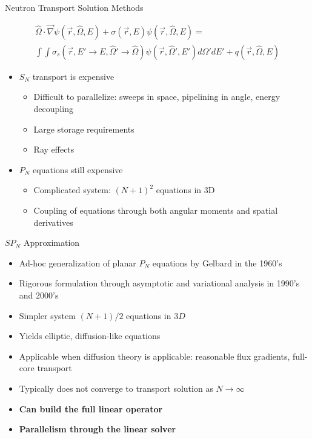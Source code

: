 \documentclass{beamer}
\begin{document}
\begin{frame}{Neutron Transport Solution Methods}

  \begin{multline}
    \hat{\Omega} \cdot \vec{\nabla} \psi(\vec{r},\hat{\Omega},E) +
    \sigma(\vec{r},E) \psi(\vec{r},\hat{\Omega},E) = \\ \int \int
    \sigma_s(\vec{r},E' \rightarrow E,\hat{\Omega}' \rightarrow
    \hat{\Omega}) \psi(\vec{r},\hat{\Omega}',E') d\Omega' dE' +
    q(\vec{r},\hat{\Omega},E)
    \label{eq:general_transport}
  \end{multline}

  \begin{itemize}
  \item $S_N$ transport is expensive
    \begin{itemize}
    \item Difficult to parallelize: sweeps in space, pipelining in
      angle, energy decoupling
    \item Large storage requirements
    \item Ray effects
    \end{itemize}
  \item $P_N$ equations still expensive
    \begin{itemize}
    \item Complicated system: $(N+1)^2$ equations in 3D
    \item Coupling of equations through both angular moments and
      spatial derivatives
    \end{itemize}
  \end{itemize}
\end{frame}

\begin{frame}{$SP_N$ Approximation}
  \begin{itemize}
  \item Ad-hoc generalization of planar $P_N$ equations by Gelbard in
    the 1960's
  \item Rigorous formulation through asymptotic and variational
    analysis in 1990's and 2000's
  \item Simpler system $(N+1)/2$ equations in $3D$
  \item Yields elliptic, diffusion-like equations
  \item Applicable when diffusion theory is applicable: reasonable
    flux gradients, full-core transport
  \item Typically does not converge to transport solution as
    $N\rightarrow \infty$
  \item {\bf Can build the full linear operator}
  \item {\bf Parallelism through the linear solver}
  \end{itemize}
\end{frame}
\end{document}
